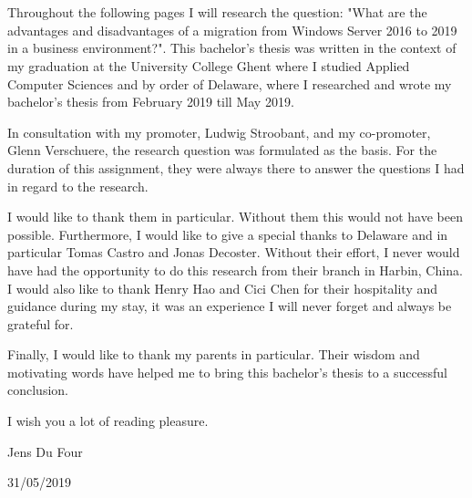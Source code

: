 
\chapter*{}
\label{ch:voorwoord}

Throughout the following pages I will research the question: "What are the advantages and disadvantages of a migration from Windows Server 2016 to 2019 in a business environment?". This bachelor's thesis was written in the context of my graduation at the University College Ghent where I studied Applied Computer Sciences and by order of Delaware, where I researched and wrote my bachelor's thesis from February 2019 till May 2019.

In consultation with my promoter, Ludwig Stroobant, and my co-promoter, Glenn Verschuere, the research question was formulated as the basis. For the duration of this assignment, they were always there to answer the questions I had in regard to the research. 

I would like to thank them in particular. Without them this would not have been possible.
Furthermore, I would like to give a special thanks to Delaware and in particular Tomas Castro and Jonas Decoster. Without their effort, I never would have had the opportunity to do this research from their branch in Harbin, China. I would also like to thank Henry Hao and Cici Chen for their hospitality and guidance during my stay, it was an experience I will never forget and always be grateful for. 

Finally, I would like to thank my parents in particular. Their wisdom and motivating words have helped me to bring this bachelor's thesis to a successful conclusion.

I wish you a lot of reading pleasure.

Jens Du Four

31/05/2019